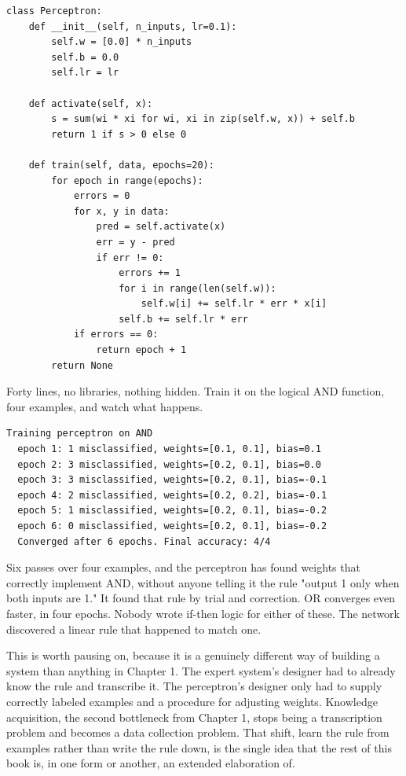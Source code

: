 \begin{Verbatim}[fontsize=\small, frame=single, xleftmargin=1em, xrightmargin=1em]
class Perceptron:
    def __init__(self, n_inputs, lr=0.1):
        self.w = [0.0] * n_inputs
        self.b = 0.0
        self.lr = lr

    def activate(self, x):
        s = sum(wi * xi for wi, xi in zip(self.w, x)) + self.b
        return 1 if s > 0 else 0

    def train(self, data, epochs=20):
        for epoch in range(epochs):
            errors = 0
            for x, y in data:
                pred = self.activate(x)
                err = y - pred
                if err != 0:
                    errors += 1
                    for i in range(len(self.w)):
                        self.w[i] += self.lr * err * x[i]
                    self.b += self.lr * err
            if errors == 0:
                return epoch + 1
        return None
\end{Verbatim}

Forty lines, no libraries, nothing hidden. Train it on the logical AND function, four examples, and watch what happens.

\begin{Verbatim}[fontsize=\small, frame=single, xleftmargin=1em, xrightmargin=1em]
Training perceptron on AND
  epoch 1: 1 misclassified, weights=[0.1, 0.1], bias=0.1
  epoch 2: 3 misclassified, weights=[0.2, 0.1], bias=0.0
  epoch 3: 3 misclassified, weights=[0.2, 0.1], bias=-0.1
  epoch 4: 2 misclassified, weights=[0.2, 0.2], bias=-0.1
  epoch 5: 1 misclassified, weights=[0.2, 0.1], bias=-0.2
  epoch 6: 0 misclassified, weights=[0.2, 0.1], bias=-0.2
  Converged after 6 epochs. Final accuracy: 4/4
\end{Verbatim}

Six passes over four examples, and the perceptron has found weights that correctly implement AND, without anyone telling it the rule "output 1 only when both inputs are 1." It found that rule by trial and correction. OR converges even faster, in four epochs. Nobody wrote if-then logic for either of these. The network discovered a linear rule that happened to match one.

This is worth pausing on, because it is a genuinely different way of building a system than anything in Chapter 1. The expert system's designer had to already know the rule and transcribe it. The perceptron's designer only had to supply correctly labeled examples and a procedure for adjusting weights. Knowledge acquisition, the second bottleneck from Chapter 1, stops being a transcription problem and becomes a data collection problem. That shift, learn the rule from examples rather than write the rule down, is the single idea that the rest of this book is, in one form or another, an extended elaboration of.

